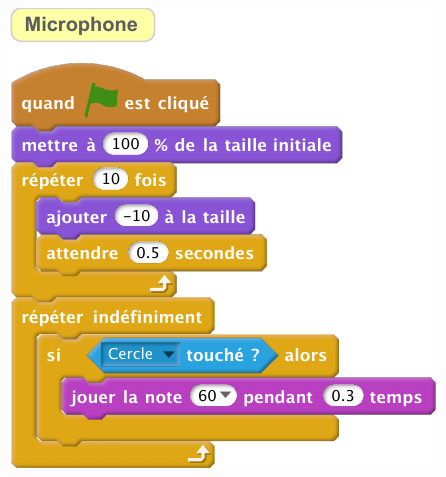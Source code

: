 \documentclass[class=report,crop=false, 12pt]{standalone}
\begin{document}
\begin{code}
{\includegraphics[scale=\scalesolution,scale=0.9]{code-09-ex3c}
}    
\end{code}
\fi
\end{document}
